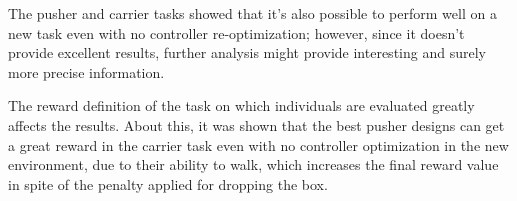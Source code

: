 The pusher and carrier tasks showed that it's also possible to perform well on a new task even with no controller re-optimization; however, since it doesn't provide excellent results, further analysis might provide interesting and surely more precise information.

The reward definition of the task on which individuals are evaluated greatly affects the results.
About this, it was shown that the best pusher designs can get a great reward in the carrier task even with no controller optimization in the new environment, due to their ability to walk, which increases the final reward value in spite of the penalty applied for dropping the box.

\newpage